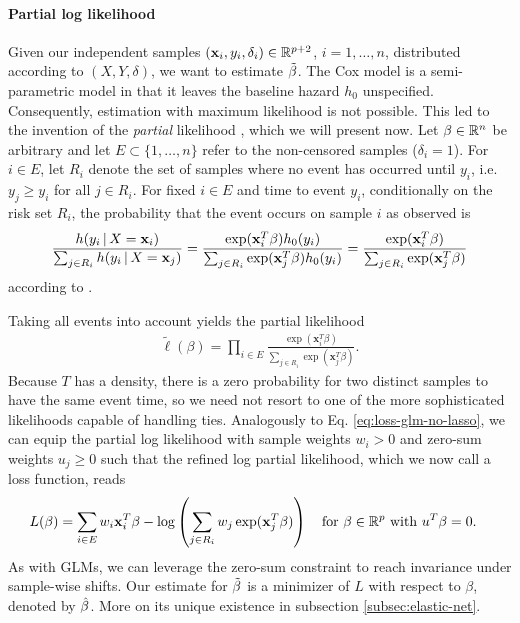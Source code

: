 \paragraph{Partial log likelihood}
Given our independent samples $(\mathbf{x}_i, y_i, \delta_i) \in \mathbb{R}^{p+2}$, $i = 1, \ldots, n$, distributed 
according to $(X, Y, \delta)$, we want to estimate $\tilde{\beta}$. The Cox model is a semi-parametric 
model in that it leaves the baseline hazard $h_0$ unspecified. Consequently, estimation with maximum 
likelihood is not possible. This led to the invention of the \textit{partial} likelihood 
\cite{cox72}, which we will present now. Let $\beta \in \mathbb{R}^n$ be arbitrary and let 
$E \subset \{ 1, \ldots, n \}$ refer to the non-censored samples ($\delta_i = 1$). For $i \in E$, 
let $R_i$ denote the set of samples 
where no event has occurred until $y_i$, i.e. $y_j \geq y_i$ for all $j \in R_i$. For
fixed $i \in E$ and time to event $y_i$, conditionally on the risk set $R_i$, the probability that 
the event occurs on sample $i$ as observed is
\begin{align}
    \frac{h(y_i \,|\, X = \mathbf{x}_i)}{\sum_{j \in R_i} h(y_i \,|\, X = \mathbf{x}_j)} = 
    \frac{\exp(\mathbf{x}_i^T \beta) h_0(y_i)}{\sum_{j \in R_i} \exp(\mathbf{x}_j^T \beta) h_0(y_i)} = 
    \frac{\exp(\mathbf{x}_i^T \beta)}{\sum_{j \in R_i} \exp(\mathbf{x}_j^T \beta)}
\end{align}
according to \cite[Eq. (12)]{cox72}.

Taking all events into account yields the partial likelihood 
\begin{align}\label{eq:cox-partial-lh}
    \tilde{\ell}(\beta) = \prod_{i \in E} \frac{\exp(\mathbf{x}_i^T \beta)}{\sum_{j \in R_i} \exp(\mathbf{x}_j^T 
    \beta)}.
\end{align}
Because $T$ has a density, there is a zero probability for two distinct samples to have the same 
event time, so we need not resort to one of the more sophisticated likelihoods capable of handling ties.
Analogously to Eq. \eqref{eq:loss-glm-no-lasso}, we can equip the partial log likelihood with sample 
weights $w_i > 0$ and zero-sum weights $u_j \geq 0$ such that the refined log partial likelihood, 
which we now call a loss function, reads 
\begin{align}\label{eq:cox-loss}
\begin{split}
    L(\beta) &= \sum_{i \in E} w_i \mathbf{x}_i^T \beta - \log \left( \sum_{j \in R_i} w_j \exp(\mathbf{x}_j^T
    \beta) \right) \quad \text{for } \beta \in \mathbb{R}^p \text{ with } u^T \beta = 0.
\end{split}
\end{align}
As with GLMs, we can leverage the zero-sum constraint to reach invariance under sample-wise shifts. 
Our estimate for $\tilde{\beta}$ is a minimizer of $L$ with respect to $\beta$, denoted by $\hat{\beta}$. 
More on its unique existence in subsection \ref{subsec:elastic-net}.

